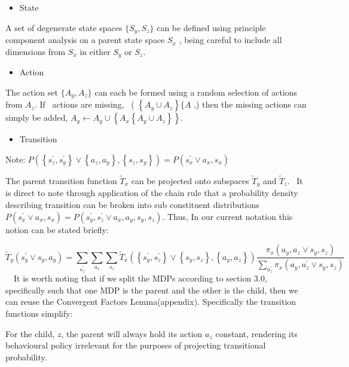 \documentclass{article}
\begin{document}
\begin{itemize}
\item State
\end{itemize}
A set of degenerate state spaces  $\{S_y,S_z\}$ can be defined using principle component analysis on a parent state space  $S_x$ , being careful to include all dimensions from  $S_x$ in either  $S_y$ or  $S_z$.

\begin{itemize}
\item Action
\end{itemize}
The action set  $\{A_y,A_z\}$ can each be formed using a random selection of actions from  $A_z$. If \ actions are missing, \ (  $\left\{A_y{\cup}A_z\right\}\{A$ ,) then the missing actions can simply be added,  $A_y\leftarrow A_y{\cup}\left\{A_x\left\{A_y{\cup}A_z\right\}\right\}$.

\begin{itemize}
\item Transition
\end{itemize}
Note:  $P\left(\left\{s_z^',s_y^'\right\}\vee \left\{a_z,a_y\right\},\left\{s_z,s_y\right\}\right)=P\left(s_x^'\vee a_x,s_x\right)$

The parent transition function  $\widetilde T_x$ can be projected onto subspaces  $\widetilde T_y$ and  $\widetilde T_z$. \ It is direct to note through application of the chain rule that a probability density describing transition can be broken into sub constituent distributions $ $  $P\left(s_x^'\vee a_x,s_x\right)=P\left(s_y^',s_z^'\vee a_x,a_y,s_y,s_z\right)$. Thus, In our current notation this notion can be stated briefly:

\begin{equation}
\widetilde T_y\left(s_y^'\vee s_y^{},a_y\right)=\sum _{s_z^'}^{}\sum _{a_z}^{}\sum _{s_z}^{}\widetilde T_x\left(\left\{s_y^',s_z^'\right\}\vee \left\{s_y^{},s_z^{}\right\},\left\{a_y,a_z\right\}\right)\frac{\pi _x\left(a_y,a_z\vee s_y,s_z\right)}{\sum _{a_z^'}^{}\pi _x\left(a_y,a_z^'\vee s_y,s_z\right)}
\end{equation}
\ \ It is worth noting that if we split the MDPs according to section 3.0, specifically such that one MDP is the parent and the other is the child, then we can reuse the Convergent Factors Lemma(appendix). Specifically the transition functions simplify: 

For the child,  $z$, the parent will always hold its action  $a_z$ constant, rendering its behavioural policy irrelevant for the purposes of projecting transitional probability. 
\end{document}
